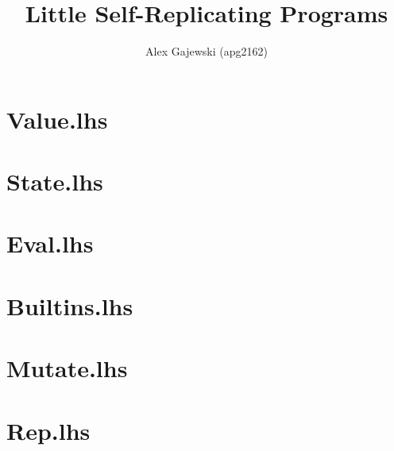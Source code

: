 \documentclass[letterpaper,11pt]{article}
\title{Little Self-Replicating Programs}
\author{Alex Gajewski (apg2162)}
\begin{document}
\begin{titlepage}
\maketitle
\end{titlepage}

\section{Value.lhs}


\newpage
\section{State.lhs}


\newpage
\section{Eval.lhs}


\newpage
\section{Builtins.lhs}


\newpage
\section{Mutate.lhs}


\newpage
\section{Rep.lhs}

\end{document}
